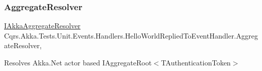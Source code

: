 \subsubsection{\texorpdfstring{Aggregate\+Resolver}{AggregateResolver}}
{\footnotesize\ttfamily \hyperlink{interfaceCqrs_1_1Akka_1_1Domain_1_1IAkkaAggregateResolver}{I\+Akka\+Aggregate\+Resolver} Cqrs.\+Akka.\+Tests.\+Unit.\+Events.\+Handlers.\+Hello\+World\+Replied\+To\+Event\+Handler.\+Aggregate\+Resolver\hspace{0.3cm}{\ttfamily [get]}, {\ttfamily [protected]}}



Resolves Akka.\+Net actor based I\+Aggregate\+Root$<$\+T\+Authentication\+Token$>$ 

